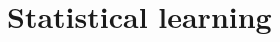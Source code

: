 \documentclass[12pt]{article}
\begin{document}
%
%
%

\section{Statistical learning}
\end{document}
